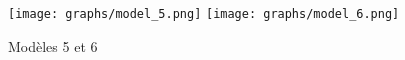 
\begin{figure}[H]
    \centering
    \texttt{[image: graphs/model\_5.png]}
    \texttt{[image: graphs/model\_6.png]}
    \caption{Modèles 5 et 6}
\end{figure}




